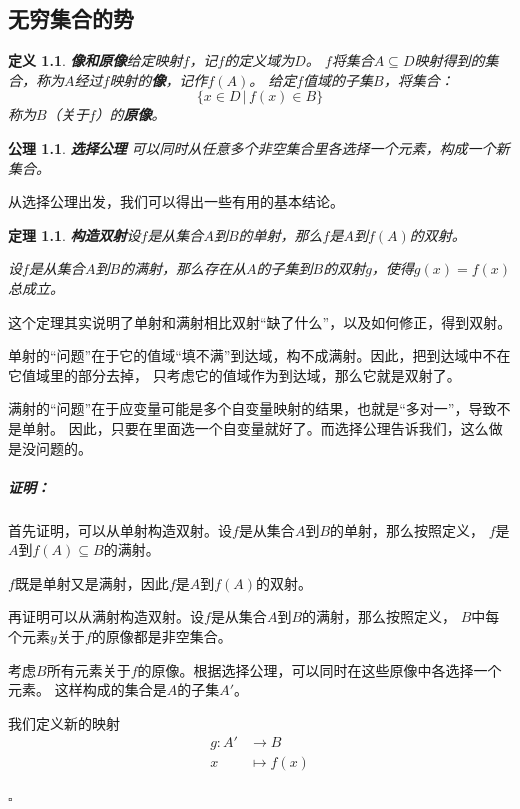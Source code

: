 \documentclass[12pt,UTF8]{ctexbook}
\renewenvironment{proof}{\paragraph{\textbf{证明：}}}{\hfill$\square$}
\newtheorem{df}{定义}[section]
\newtheorem{tm}{定理}[section]
\newtheorem*{po}{公理}
\begin{document}
\begin{appendix}

\chapter{无穷集合的势}

\begin{df}{\textbf{像和原像}}\label{df:a-1-0}
    给定映射$f$，记$f$的定义域为$D$。
    $f$将集合$A\subseteq D$映射得到的集合，称为$A$经过$f$映射的\textbf{像}，记作$f(A)$。
    给定$f$值域的子集$B$，将集合：
    $$ \{x \in D \, | \, f(x) \in B \}$$
    称为$B$（关于$f$）的\textbf{原像}。
\end{df}

\begin{po}{\textbf{选择公理}}
    可以同时从任意多个非空集合里各选择一个元素，构成一个新集合。
\end{po}

从选择公理出发，我们可以得出一些有用的基本结论。

\begin{tm}{\textbf{构造双射}}\label{tm:a-1-0}
    设$f$是从集合$A$到$B$的单射，那么$f$是$A$到$f(A)$的双射。

    设$f$是从集合$A$到$B$的满射，那么存在从$A$的子集到$B$的双射$g$，使得$g(x) = f(x)$总成立。
\end{tm}

这个定理其实说明了单射和满射相比双射“缺了什么”，以及如何修正，得到双射。

单射的“问题”在于它的值域“填不满”到达域，构不成满射。因此，把到达域中不在它值域里的部分去掉，
只考虑它的值域作为到达域，那么它就是双射了。

满射的“问题”在于应变量可能是多个自变量映射的结果，也就是“多对一”，导致不是单射。
因此，只要在里面选一个自变量就好了。而选择公理告诉我们，这么做是没问题的。

\begin{proof}
    首先证明，可以从单射构造双射。设$f$是从集合$A$到$B$的单射，那么按照定义，
    $f$是$A$到$f(A)\subseteq B$的满射。

    $f$既是单射又是满射，因此$f$是$A$到$f(A)$的双射。

    再证明可以从满射构造双射。设$f$是从集合$A$到$B$的满射，那么按照定义，
    $B$中每个元素$y$关于$f$的原像都是非空集合。

    考虑$B$所有元素关于$f$的原像。根据选择公理，可以同时在这些原像中各选择一个元素。
    这样构成的集合是$A$的子集$A'$。

    我们定义新的映射
    \begin{align*}
        g: A' &\rightarrow B \\
        x &\mapsto f(x)
    \end{align*}
    

\end{proof}
\end{appendix}
\end{document}

